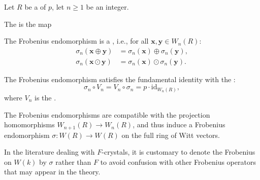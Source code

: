 \begin{definition}\label{definition:frobenius_endomorphism_on_truncated_witt_vectors_of_length_n_over_a_commutative_ring}
Let $R$ be a  of  $p$, let $n \geq 1$ be an integer.

The  is the map

The Frobenius endomorphism is a , i.e., for all $\mathbf{x}, \mathbf{y} \in W_n(R)$:
\begin{align*}
    \sigma_n(\mathbf{x} \oplus \mathbf{y}) &= \sigma_n(\mathbf{x}) \oplus \sigma_n(\mathbf{y}), \\
    \sigma_n(\mathbf{x} \odot \mathbf{y}) &= \sigma_n(\mathbf{x}) \odot \sigma_n(\mathbf{y}).
\end{align*}

The Frobenius endomorphism satisfies the fundamental identity with the :
$$
    \sigma_n \circ V_n = V_n \circ \sigma_n = p \cdot \mathrm{id}_{W_n(R)},
$$
where $V_n$ is the .

The Frobenius endomorphisms are compatible with the projection homomorphisms $W_{n+1}(R) \to W_n(R)$, and thus induce a Frobenius endomorphism $\sigma: W(R) \to W(R)$ on the full ring of Witt vectors.

\begin{remark}
In the literature dealing with $F$-crystals, it is customary to denote the Frobenius on $W(k)$ by $\sigma$ rather than $F$ to avoid confusion with other Frobenius operators that may appear in the theory.
\end{remark}
\end{definition}
